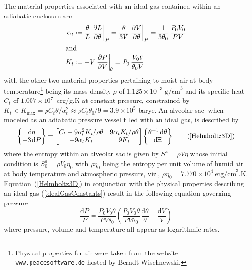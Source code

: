 The material properties associated with an ideal gas contained within an adiabatic enclosure are
\begin{subequations}
    \label{idealGasConstants}
    \begin{align}
\alpha_t & \defeq \frac{\theta}{L} \left. \frac{\partial L}{\partial \theta} \right|_P =
\frac{\theta}{3V} \left. \frac{\partial V}{\partial \theta} \right|_P = 
\frac{1}{3\theta_0} \, \frac{P_0 V_0}{P V} \\
\intertext{and}
K_t & \defeq -V \left. \frac{\partial P}{\partial V} \right|_{\theta} = 
P_0 \, \frac{V_0 \hspace{0.5pt} \theta}{\theta_0 V}
\end{align}
\end{subequations}
with the other two material properties pertaining to moist air at body temperature\footnote{
    Physical properties for air were taken from the website \texttt{www.peacesoftware.de} hosted by Berndt Wischnewski.
}
being its mass density $\rho$ of $1.125 \times 10^{-3} \; \text{g/cm}^3$ and its specific heat $C_t$ of $1.007 \times 10^7$~erg/g.K at constant pressure, constrained by $K_t < K_{\max} = \rho C_t \theta / \alpha^2_t \approx \rho C_t \theta_0 / 9 = 3.9 \times 10^5$ barye.  An alveolar sac, when modeled as an adiabatic pressure vessel filled with an ideal gas, is described by
\begin{equation}
\left\{ \begin{matrix}
    \mathrm{d} \eta \\ -3 \, \mathrm{d} P
\end{matrix} \right\} = \begin{bmatrix}
    C_t - 9 \alpha^2_t K_t / \rho \theta & 
    9 \alpha_t K_t / \rho \theta \\
    -9 \alpha_t K_t & 9 K_t
\end{bmatrix} \left\{ \begin{matrix}
    \theta^{-1} \, \mathrm{d} \theta \\ \mathrm{d} \Xi
\end{matrix} \right\}
\tag{\ref{Helmholtz3D}}
\end{equation}
where the entropy within an alveolar sac is given by $S^a = \rho V \eta$ whose initial condition is $S^a_0 = \rho V_0 \eta_0$ with $\rho \eta_0$ being the entropy per unit volume of humid air at body temperature and atmospheric pressure, viz., $\rho \eta_0 = 7.770 \times 10^4 \: \text{erg/cm}^3\text{.K}$.  Equation~(\ref{Helmholtz3D}) in conjunction with the physical properties describing an ideal gas (\ref{idealGasConstants}) result in the following equation governing pressure
\begin{displaymath}
\frac{\mathrm{d} P}{P} = \frac{P_0 V_0 \theta}{P V \theta_0} \left( 
\frac{P_0 V_0 \theta}{P V \theta_0} \, \frac{\mathrm{d} \theta}{\theta} - 
\frac{\mathrm{d} V}{V} \right)
\end{displaymath}
where pressure, volume and temperature all appear as logarithmic rates.

